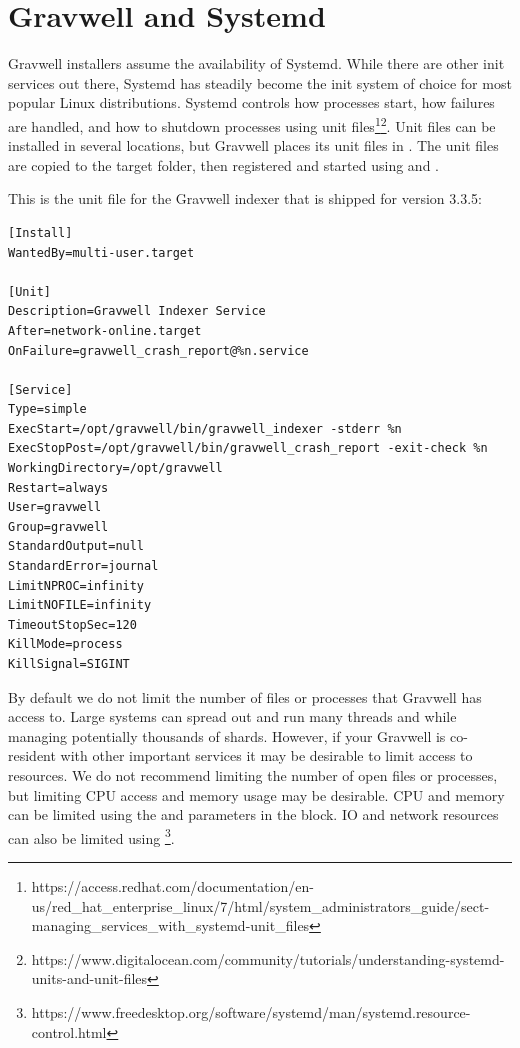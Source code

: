 \section{Gravwell and Systemd}
{Gravwell installers assume the availability of Systemd. While there are
other init services out there, Systemd has steadily become the
init system of choice for most popular Linux distributions. Systemd
controls how processes start, how failures are handled, and how to
shutdown processes using unit
files\footnote{https://access.redhat.com/documentation/en-us/red\_hat\_enterprise\_linux/7/html/system\_administrators\_guide/sect-managing\_services\_with\_systemd-unit\_files}\footnote{https://www.digitalocean.com/community/tutorials/understanding-systemd-units-and-unit-files}.
Unit files can be installed in several locations, but Gravwell places
its unit files in . The unit files are copied
to the target folder, then registered and started using  and .

This is the unit file for the Gravwell indexer that is shipped for
version 3.3.5:

\begin{Verbatim}[breaklines=true]
[Install]
WantedBy=multi-user.target

[Unit]
Description=Gravwell Indexer Service
After=network-online.target
OnFailure=gravwell_crash_report@%n.service

[Service]
Type=simple
ExecStart=/opt/gravwell/bin/gravwell_indexer -stderr %n
ExecStopPost=/opt/gravwell/bin/gravwell_crash_report -exit-check %n
WorkingDirectory=/opt/gravwell
Restart=always
User=gravwell
Group=gravwell
StandardOutput=null
StandardError=journal
LimitNPROC=infinity
LimitNOFILE=infinity
TimeoutStopSec=120
KillMode=process
KillSignal=SIGINT
\end{Verbatim}

By default we do not limit the number of files or processes that
Gravwell has access to. Large systems can spread out and run many
threads and while managing potentially thousands of shards. However, if
your Gravwell is co-resident with other important services it may be
desirable to limit access to resources. We do not recommend limiting
the number of open files or processes, but limiting CPU access and
memory usage may be desirable. CPU and memory can be limited using the
 and  parameters in the
\code{[Service]} block. IO and network resources can also be limited
using
\footnote{https://www.freedesktop.org/software/systemd/man/systemd.resource-control.html}.


}
